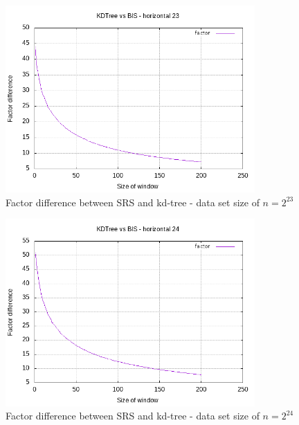 \begin{figure}[h]
    \centering
    \includegraphics[width = 0.85\textwidth]{pictures/analysis/smalls/hori_fac_23.png}
    \caption{Factor difference between SRS and kd-tree - data set size of $n=2^{23}$}\label{fig:small_hori_fac_23}
\end{figure}

\begin{figure}[h]
    \centering
    \includegraphics[width = 0.85\textwidth]{pictures/analysis/smalls/hori_fac_24.png}
    \caption{Factor difference between SRS and kd-tree - data set size of $n=2^{24}$}\label{fig:small_hori_fac_24}
\end{figure}

